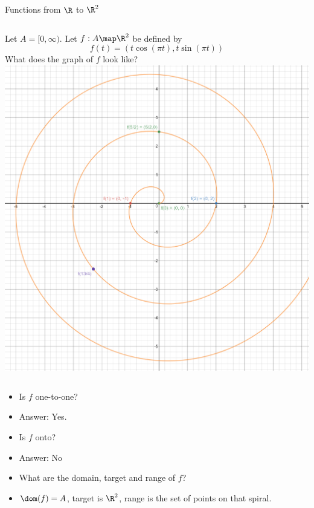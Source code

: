 \documentclass{beamer}
\begin{document}
\begin{frame}{Functions from $\R$ to $\R^2$}

\begin{columns}
\column[T]{5cm}
Let $A=[0, \infty)$. Let $f:A\map \R^2$ be defined by
$$f(t) = (t \cos(\pi t), t \sin(\pi t))$$
What does the graph of $f$ look like?
\column[T]{5cm}
\includegraphics[scale=0.1]{spiral}
\end{columns}

\begin{itemize}
\item Is $f$ one-to-one?
\item Answer: Yes.
\item Is $f$ onto?
\item Answer: No
\item What are the domain, target and range of $f$?
\item $\dom(f) = A$, target is $\R^2$, range is the set of points on that
spiral.
\end{itemize}

\end{frame}
\end{document}
